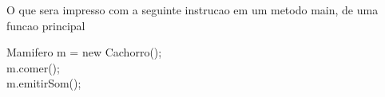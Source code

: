 \begin{question}
    O que sera impresso com a seguinte instrucao em um metodo main, de uma funcao principal

    Mamifero m = new Cachorro(); \\
    m.comer(); \\
    m.emitirSom(); \\
\end{question}
